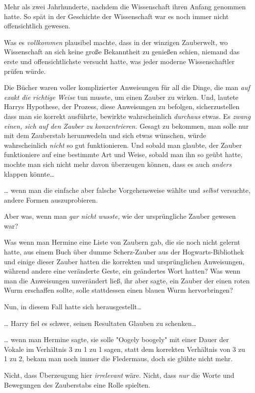 {Mehr als zwei Jahrhunderte, nachdem die Wissenschaft ihren Anfang genommen hatte. So spät in der Geschichte der Wissenschaft war es noch immer nicht offensichtlich gewesen.

Was es \emph{vollkommen} plausibel machte, dass in der winzigen Zauberwelt, wo Wissenschaft an sich keine große Bekanntheit zu genießen schien, niemand das erste und offensichtlichste versucht hatte, was jeder moderne Wissenschaftler prüfen würde.

Die Bücher waren voller komplizierter Anweisungen für all die Dinge, die man \emph{auf exakt die richtige Weise} tun musste, um einen Zauber zu wirken. Und, lautete Harrys Hypothese, der Prozess, diese Anweisungen zu befolgen, sicherzustellen dass man sie korrekt ausführte, bewirkte wahrscheinlich \emph{durchaus} etwas. Es \emph{zwang einen, sich auf den Zauber zu konzentrieren.} Gesagt zu bekommen, man solle nur mit dem Zauberstab herumwedeln und sich etwas wünschen, würde wahrscheinlich \emph{nicht} so gut funktionieren. Und sobald man glaubte, der Zauber funktioniere auf eine bestimmte Art und Weise, sobald man ihn so geübt hatte, mochte man sich nicht mehr davon überzeugen können, dass es auch \emph{anders} klappen könnte…

… wenn man die einfache aber falsche Vorgehensweise wählte und \emph{selbst} versuchte, andere Formen auszuprobieren.

Aber was, wenn man \emph{gar nicht wusste,} wie der ursprüngliche Zauber gewesen war?

Was wenn man Hermine eine Liste von Zaubern gab, die sie noch nicht gelernt hatte, aus einem Buch über dumme Scherz-Zauber aus der Hogwarts-Bibliothek und einige dieser Zauber hatten die korrekten und ursprünglichen Anweisungen, während andere eine veränderte Geste, ein geändertes Wort hatten? Was wenn man die Anweisungen unverändert ließ, ihr aber sagte, ein Zauber der einen roten Wurm erschaffen sollte, solle stattdessen einen blauen Wurm hervorbringen?

Nun, in diesem Fall hatte sich herausgestellt…

… Harry fiel es schwer, seinen Resultaten Glauben zu schenken…

… wenn man Hermine sagte, sie solle "Oogely boogely" mit einer Dauer der Vokale im Verhältnis 3 zu 1 zu 1 sagen, statt dem korrekten Verhältnis von 3 zu 1 zu 2, bekam man noch immer die Fledermaus, doch sie glühte nicht mehr.

Nicht, dass Überzeugung hier \emph{irrelevant} wäre. Nicht, dass \emph{nur} die Worte und Bewegungen des Zauberstabs eine Rolle spielten.

}
